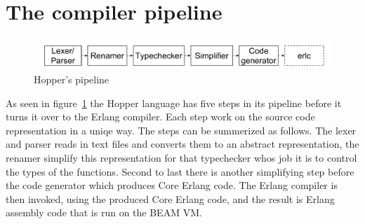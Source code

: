 \section{The compiler pipeline}


\begin{figure}[h!]
\centering
  \includegraphics[width=0.6\pdfpagewidth]{figure/pipeline}
  \caption{Hopper's pipeline}
  \label{fig:pipeline}
\end{figure}


As seen in figure~\ref{fig:pipeline} the Hopper language has five steps in its 
pipeline before it turns it over to the Erlang compiler. Each step work on the 
source code representation in a uniqe way. The steps can be summerized as
follows. The lexer and parser reads in text files and converts them to an 
abstract representation, the renamer simplify this representation for that 
typechecker whos job it is to control the types of the functions. Second to last 
there is another simplifying step before the code generator which produces Core
Erlang code. The Erlang compiler is then invoked, using the produced Core Erlang
code, and the result is Erlang assembly code that is run on the BEAM VM.
